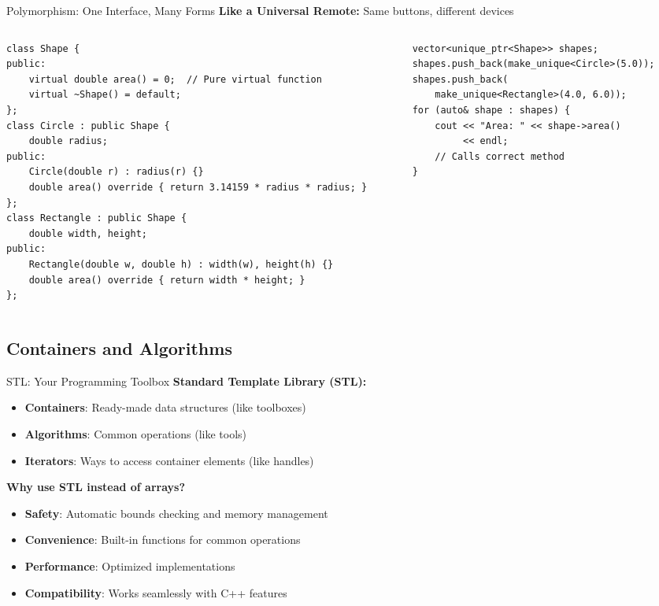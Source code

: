 \begin{frame}[fragile]{ Polymorphism: One Interface, Many Forms}
    \textbf{Like a Universal Remote:} Same buttons, different devices

    \begin{columns}
        \begin{column}{0.6\textwidth}
    \begin{verbatim}
class Shape {
public:
    virtual double area() = 0;  // Pure virtual function
    virtual ~Shape() = default;
};
class Circle : public Shape {
    double radius;
public:
    Circle(double r) : radius(r) {}
    double area() override { return 3.14159 * radius * radius; }
};
class Rectangle : public Shape {
    double width, height;
public:
    Rectangle(double w, double h) : width(w), height(h) {}
    double area() override { return width * height; }
};
    \end{verbatim}
        \end{column}
        \begin{column}{0.4\textwidth}

    \begin{verbatim}
vector<unique_ptr<Shape>> shapes;
shapes.push_back(make_unique<Circle>(5.0));
shapes.push_back(
    make_unique<Rectangle>(4.0, 6.0));
for (auto& shape : shapes) {
    cout << "Area: " << shape->area()
         << endl;
    // Calls correct method
}
    \end{verbatim}
    \end{column}
    \end{columns}
\end{frame}

\subsection{Containers and Algorithms}
\begin{frame}[fragile]{ STL: Your Programming Toolbox}
    \textbf{Standard Template Library (STL):}
    \begin{itemize}
        \item \textbf{Containers}: Ready-made data structures (like toolboxes)
        \item \textbf{Algorithms}: Common operations (like tools)
        \item \textbf{Iterators}: Ways to access container elements (like handles)
    \end{itemize}

    \vspace{0.5em}
    \textbf{Why use STL instead of arrays?}
    \begin{itemize}
        \item \textbf{Safety}: Automatic bounds checking and memory management
        \item \textbf{Convenience}: Built-in functions for common operations
        \item \textbf{Performance}: Optimized implementations
        \item \textbf{Compatibility}: Works seamlessly with C++ features
    \end{itemize}
\end{frame}

